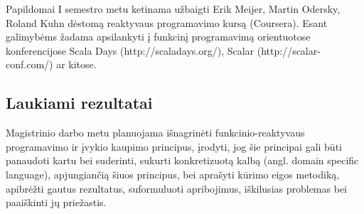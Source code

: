 \documentclass[12pt, a4paper, lithuanian]{article}
\begin{document}
    Papildomai I semestro metu ketinama užbaigti Erik Meijer, Martin Odersky, Roland Kuhn dėstomą reaktyvaus programavimo kursą (Coursera). Esant galimybėms žadama apsilankyti į funkcinį programavimą orientuotose konferencijose Scala Days (http://scaladays.org/), Scalar (http://scalar-conf.com/) ar kitose.

\subsection{Laukiami rezultatai}

    Magistrinio darbo metu planuojama išnagrinėti funkcinio-reaktyvaus programavimo ir įvykio kaupimo principus, įrodyti, jog šie principai gali būti panaudoti kartu bei suderinti, sukurti konkretizuotą kalbą (angl. domain specific language), apjungiančią šiuos principus, bei aprašyti kūrimo eigos metodiką, apibrėžti gautus rezultatus, suformuluoti apribojimus, iškilusias problemas bei paaiškinti jų priežastis.

\nocite{*}

\end{document}
